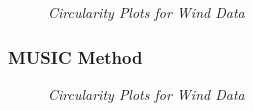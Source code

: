 \documentclass[./main.tex]{subfiles}
\begin{document}
\begin{figure}[h]
	\centering 
	\resizebox{\textwidth}{!}{}
	\caption{\textit{Circularity Plots for Wind Data}}
	\label{fig:2_1_d_freq}
\end{figure}


\subsubsection{MUSIC Method}

\begin{figure}[h]
	\centering 
	\resizebox{0.6\textwidth}{!}{}
	\caption{\textit{Circularity Plots for Wind Data}}
	\label{fig:2_1_e}
\end{figure}

 		
         
 		
\end{document}
